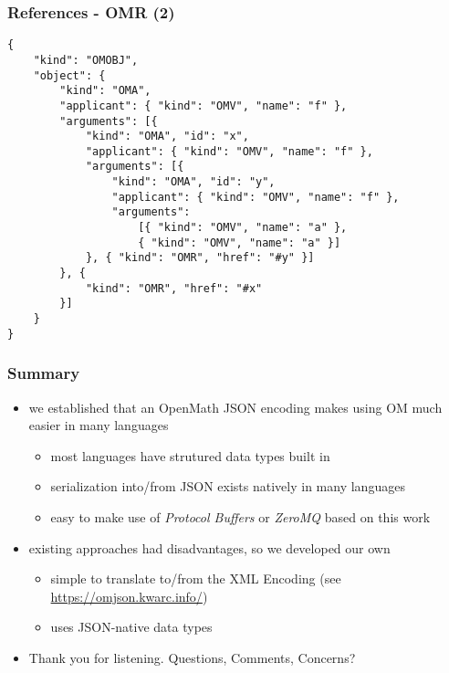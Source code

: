 \documentclass[usenames,dvipsnames]{beamer}
\begin{document}
\begin{frame}[fragile]
    \frametitle{References - OMR (2)}
\begin{lstlisting}
{
    "kind": "OMOBJ",
    "object": {
        "kind": "OMA",
        "applicant": { "kind": "OMV", "name": "f" },
        "arguments": [{ 
            "kind": "OMA", "id": "x",
            "applicant": { "kind": "OMV", "name": "f" },
            "arguments": [{
                "kind": "OMA", "id": "y",
                "applicant": { "kind": "OMV", "name": "f" },
                "arguments": 
                    [{ "kind": "OMV", "name": "a" },
                    { "kind": "OMV", "name": "a" }]
            }, { "kind": "OMR", "href": "#y" }]
        }, {
            "kind": "OMR", "href": "#x" 
        }]
    }
}
\end{lstlisting}
\end{frame}



\begin{frame}
    \frametitle{Summary}
    \begin{itemize}
        \item we established that an OpenMath JSON encoding makes using OM much easier in many languages
        \begin{itemize}
            \item most languages have strutured data types built in
            \item serialization into/from JSON exists natively in many languages
            \item easy to make use of \textit{Protocol Buffers} or \textit{ZeroMQ} based on this work
        \end{itemize}
        \item existing approaches had disadvantages, so we developed our own
        \begin{itemize}
            \item simple to translate to/from the XML Encoding (see \url{https://omjson.kwarc.info/})
            \item uses JSON-native data types
        \end{itemize}
        \item Thank you for listening. Questions, Comments, Concerns?
    \end{itemize}
\end{frame}
\end{document}
